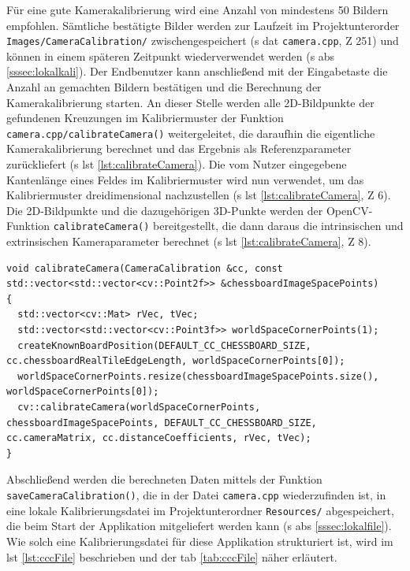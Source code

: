 \noindent Für eine gute Kamerakalibrierung wird eine Anzahl von mindestens 50 Bildern empfohlen. Sämtliche bestätigte Bilder werden zur Laufzeit im Projektunterorder \glqq \texttt{Images/CameraCalibration/}\grqq{} zwischengespeichert (\acs{s} \acs{dat} \texttt{camera.cpp}, \acs{Z} 251) und können in einem späteren Zeitpunkt wiederverwendet werden (\acs{s} \acs{abs} \ref{sssec:lokalkali}). Der Endbenutzer kann anschließend mit der Eingabetaste die Anzahl an gemachten Bildern bestätigen und die Berechnung der Kamerakalibrierung starten. An dieser Stelle werden alle 2D-Bildpunkte der gefundenen Kreuzungen im Kalibriermuster der Funktion \texttt{camera.cpp/calibrateCamera()} weitergeleitet, die daraufhin die eigentliche Kamerakalibrierung berechnet und das Ergebnis als Referenzparameter zurückliefert (\acs{s} \acs{lst} \ref{lst:calibrateCamera}). Die vom Nutzer eingegebene Kantenlänge eines Feldes im Kalibriermuster wird nun verwendet, um das Kalibriermuster dreidimensional nachzustellen (\acs{s} \acs{lst} \ref{lst:calibrateCamera}, \acs{Z} 6). Die 2D-Bildpunkte und die dazugehörigen 3D-Punkte werden der OpenCV-Funktion \texttt{calibrateCamera()} bereitgestellt, die dann daraus die intrinsischen und extrinsischen Kameraparameter berechnet (\acs{s} \acs{lst} \ref{lst:calibrateCamera}, \acs{Z} 8).

\newpage

\begin{lstlisting}[caption={Die Funktion \texttt{camera.cpp/calibrateCamera()} berechnet anhand von übergebenen 2D-Bildpunkten eines Kalibriermusters die intrinsischen und extrinsischen Kameraparameter}, label={lst:calibrateCamera}]
void calibrateCamera(CameraCalibration &cc, const std::vector<std::vector<cv::Point2f>> &chessboardImageSpacePoints)
{
  std::vector<cv::Mat> rVec, tVec;
  std::vector<std::vector<cv::Point3f>> worldSpaceCornerPoints(1);
  createKnownBoardPosition(DEFAULT_CC_CHESSBOARD_SIZE, cc.chessboardRealTileEdgeLength, worldSpaceCornerPoints[0]);
  worldSpaceCornerPoints.resize(chessboardImageSpacePoints.size(), worldSpaceCornerPoints[0]);
  cv::calibrateCamera(worldSpaceCornerPoints, chessboardImageSpacePoints, DEFAULT_CC_CHESSBOARD_SIZE, cc.cameraMatrix, cc.distanceCoefficients, rVec, tVec);
}
\end{lstlisting}

\noindent Abschließend werden die berechneten Daten mittels der Funktion \texttt{saveCameraCalibration()}, die in der Datei \texttt{camera.cpp} wiederzufinden ist, in eine lokale Kalibrierungsdatei im Projektunterordner \glqq \texttt{Resources/}\grqq{} abgespeichert, die beim Start der Applikation mitgeliefert werden kann (\acs{s} \acs{abs} \ref{sssec:lokalfile}). Wie solch eine Kalibrierungsdatei für diese Applikation strukturiert ist, wird im \acs{lst} \ref{lst:cccFile} beschrieben und der \acs{tab} \ref{tab:cccFile} näher erläutert.

